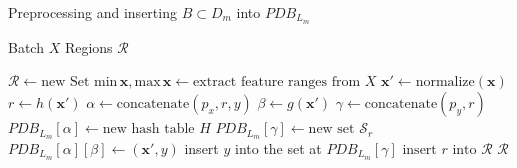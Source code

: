 \documentclass[../../main.tex]{subfiles}
\begin{document}
\begin{algorithm}
    \caption{Preprocessing and inserting $B \subset D_m$ into $PDB_{L_m}$}
    \label{alg:indexing}

    \begin{algorithmic}[1]
        \REQUIRE Batch $X$
        \ENSURE Regions $\mathcal{R}$

        \STATE $\mathcal{R} \leftarrow \text{new Set}$
        \STATE $\text{min}\,\bm{x}, \text{max}\,\bm{x} \leftarrow \text{extract feature ranges from } X$
            \STATE $\bm{x}' \leftarrow \text{normalize}(\bm{x})$ 
            \STATE $r \leftarrow h(\bm{x}')$
            \STATE $\alpha \leftarrow \text{concatenate}(p_x, r, y)$ \label{alg:indexing_kalpha}
            \STATE $\beta \leftarrow g(\bm{x}')$ \label{alg:indexing_kbeta}
            \STATE $\gamma \leftarrow \text{concatenate}(p_y,r)$ \label{alg:indexing_kgamma}
                \STATE $PDB_{L_m}[\alpha] \leftarrow \text{new hash table } H$
            \ENDIF
                \STATE $PDB_{L_m}[\gamma] \leftarrow \text{new set } \mathcal{S}_r$
            \ENDIF
            \STATE $PDB_{L_m}[\alpha][\beta] \leftarrow (\bm{x}', y)$
            \STATE insert $y$ into the set at $PDB_{L_m}[\gamma]$
            \STATE $\text{insert } r \text{ into } \mathcal{R}$
            \ENDIF         
        \ENDFOR
        \RETURN $\mathcal{R}$
    \end{algorithmic}
\end{algorithm}
\end{document}
